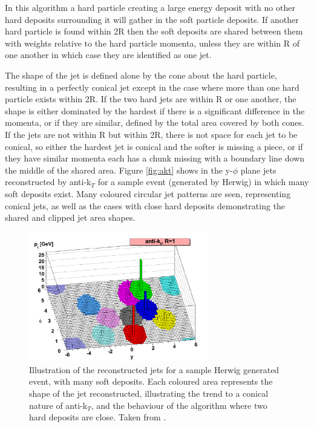 In this algorithm a hard particle creating a large energy deposit with no other hard deposits surrounding it will gather in the soft particle deposits. If another hard particle is found within 2R then the soft deposits are shared between them with weights relative to the hard particle momenta, unless they are within R of one another in which case they are identified as one jet. 

The shape of the jet is defined alone by the cone about the hard particle, resulting in a perfectly conical jet except in the case where more than one hard particle exists within 2R. If the two hard jets are within R or one another, the shape is either dominated by the hardest if there is a significant difference in the momenta, or if they are similar, defined by the total area covered by both cones. If the jets are not within R but within 2R, there is not space for each jet to be conical, so either the hardest jet is conical and the softer is missing a piece, or if they have similar momenta each has a chunk missing with a boundary line down the middle of the shared area. Figure \ref{fig:akt} shows in the y-$\phi$ plane jets reconstructed by anti-k$_{T}$ for a sample event (generated by Herwig) in which many soft deposits exist. Many coloured circular jet patterns are seen, representing conical jets, as well as the cases with close hard deposits demonstrating the shared and clipped jet area shapes. 

\begin{figure}
\centering
\includegraphics[width=0.7\textwidth]{Figures/Objects/akt}
\caption{\label{fig:act}Illustration of the reconstructed jets for a sample Herwig generated event, with many soft deposits. Each coloured area represents the shape of the jet reconstructed, illustrating the trend to a conical nature of anti-k$_{T}$, and the behaviour of the algorithm where two hard deposits are close. Taken from \cite{akt}.}
\end{figure}

